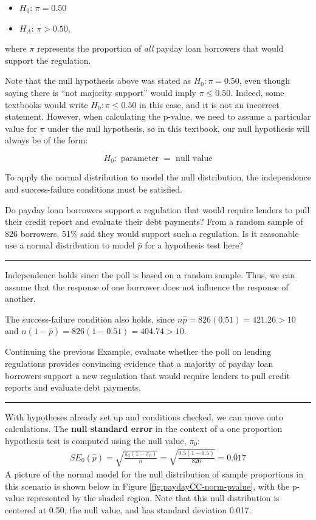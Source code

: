\documentclass[
  10pt,
  openany]{book}
\providecommand{\tightlist}{%
  \setlength{\itemsep}{0pt}\setlength{\parskip}{0pt}}
\theoremstyle{definition}
\theoremstyle{definition}
\theoremstyle{definition}
\theoremstyle{definition}
\theoremstyle{remark}
\begin{document}
\begin{itemize}
\tightlist
\item
  \(H_0\): \(\pi = 0.50\)
\item
  \(H_A\): \(\pi > 0.50\),
\end{itemize}

where \(\pi\) represents the proportion of \emph{all} payday loan borrowers that would support the regulation.

Note that the null hypothesis above was stated as \(H_0: \pi = 0.50\), even though saying there is ``not majority support'' would imply \(\pi \leq 0.50\). Indeed, some textbooks would write \(H_0: \pi \leq 0.50\) in this case, and it is not an incorrect statement. However, when calculating the p-value, we need to assume a particular value for \(\pi\) under the null hypothesis, so in this textbook, our null hypothesis will always be of the form:

\[
H_0: \mbox{ parameter } = \mbox{ null value}
\]

To apply the normal distribution to model the null distribution, the independence and success-failure conditions must be satisfied.

Do payday loan borrowers support a regulation that would require lenders to pull their credit report and evaluate their debt payments? From a random sample of 826 borrowers, 51\% said they would support such a regulation. Is it reasonable use a normal distribution to model \(\hat{p}\) for a hypothesis test here?

\begin{center}\rule{0.5\linewidth}{0.5pt}\end{center}

Independence holds since the poll is based on a random sample. Thus, we can assume that the response of one borrower does not influence the response of another.

The success-failure condition also holds, since \(n\hat{p} = 826(0.51) = 421.26 > 10\) and \(n(1-\hat{p}) = 826(1-0.51) = 404.74 > 10\).

Continuing the previous Example, evaluate whether the poll on lending regulations provides convincing evidence that a majority of payday loan borrowers support a new regulation that would require lenders to pull credit reports and evaluate debt payments.

\begin{center}\rule{0.5\linewidth}{0.5pt}\end{center}

With hypotheses already set up and conditions checked, we can move onto calculations. The \textbf{null standard error} in the context of a one proportion hypothesis test is computed using the null value, \(\pi_0\): \begin{align*}
  SE_0(\hat{p}) = \sqrt{\frac{\pi_0 (1 - \pi_0)}{n}}
      = \sqrt{\frac{0.5 (1 - 0.5)}{826}}
      = 0.017
  \end{align*} A picture of the normal model for the null distribution of sample proportions in this scenario is shown below in Figure \ref{fig:paydayCC-norm-pvalue}, with the p-value represented by the shaded region. Note that this null distribution is centered at 0.50, the null value, and has standard deviation 0.017.
\end{document}
